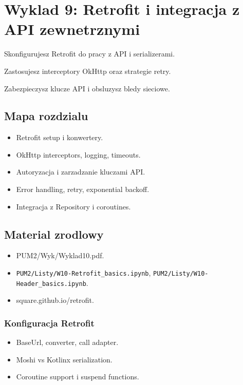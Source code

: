 \chapter{Wyklad 9: Retrofit i integracja z API zewnetrznymi}

\begin{learningobjectives}
  \item Skonfigurujesz Retrofit do pracy z API i serializerami.
  \item Zastosujesz interceptory OkHttp oraz strategie retry.
  \item Zabezpieczysz klucze API i obsluzysz bledy sieciowe.
\end{learningobjectives}

\section{Mapa rozdzialu}
\begin{itemize}
  \item Retrofit setup i konwertery.
  \item OkHttp interceptors, logging, timeouts.
  \item Autoryzacja i zarzadzanie kluczami API.
  \item Error handling, retry, exponential backoff.
  \item Integracja z Repository i coroutines.
\end{itemize}

\section{Material zrodlowy}
\begin{itemize}
  \item PUM2/Wyk/Wyklad10.pdf.
  \item \texttt{PUM2/Listy/W10-Retrofit\_basics.ipynb}, \texttt{PUM2/Listy/W10-Header\_basics.ipynb}.
  \item square.github.io/retrofit.
\end{itemize}

\subsection{Konfiguracja Retrofit}
\begin{itemize}
  \item BaseUrl, converter, call adapter.
  \item Moshi vs Kotlinx serialization.
  \item Coroutine support i suspend functions.
\end{itemize}

